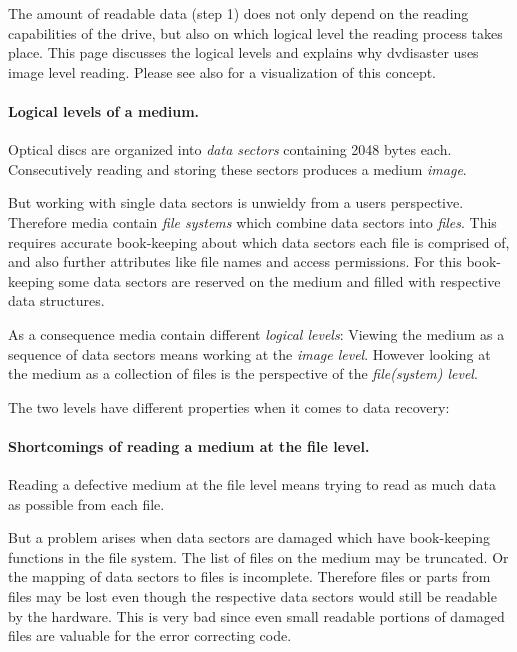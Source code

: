 The amount of readable data (step 1) does not only depend on the reading 
capabilities of the drive, but also on which logical level the reading process 
takes place. This page discusses the logical levels and explains why dvdisaster 
uses image level reading. Please see also  for
a visualization of this concept.

\paragraph{Logical levels of a medium.} Optical discs are organized into 
{\em data sectors} containing 2048 bytes each. Consecutively reading and storing 
these sectors produces a medium {\em image}.

But working with single data sectors is unwieldy from a users perspective. Therefore 
media contain {\em file systems} which combine data sectors into {\em files}. 
This requires accurate book-keeping about which data sectors each file is 
comprised of, and also further attributes like file names and access permissions. 
For this book-keeping some data sectors are reserved on the medium and filled 
with respective data structures.

As a consequence media contain different {\em logical levels}: Viewing the 
medium as a sequence of data sectors means working at the {\em image level}. 
However looking at the medium as a collection of files is the perspective of 
the {\em file(system) level}.

\smallskip

The two levels have different properties when it comes to data recovery:

\paragraph{Shortcomings of reading a medium at the file level.} Reading a defective 
medium at the file level means trying to read as much data as possible from each file.

But a problem arises when data sectors are damaged which have book-keeping 
functions in the file system. The list of files on the medium may be truncated. 
Or the mapping of data sectors to files is incomplete. Therefore files or parts 
from files may be lost even though the respective data sectors would still 
be readable by the hardware. This is very bad since even small readable portions 
of damaged files are valuable for the error correcting code.


